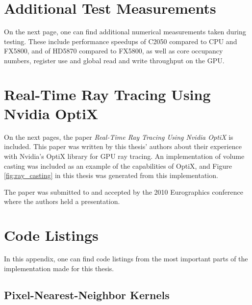 \documentclass[12pt, twoside, a4paper]{book}
\begin{document}
	
	
\chapter{Additional Test Measurements}
	\label{chapter:test_measurements}
	
	On the next page, one can find additional numerical measurements taken during testing. These include performance speedups of C2050 compared to CPU and FX5800, and of HD5870 compared to FX5800, as well as core occupancy numbers, register use and global read and write throughput on the GPU.
	
	
	
\chapter{Real-Time Ray Tracing Using Nvidia OptiX}
	\label{chapter:optix_paper}
	
	On the next pages, the paper \textit{Real-Time Ray Tracing Using Nvidia OptiX} \cite{ludvigsen2010} is included. This paper was written by this thesis' authors about their experience with Nvidia's OptiX library for GPU ray tracing. An implementation of volume casting was included as an example of the capabilities of OptiX, and Figure \ref{fig:ray_casting} in this thesis was generated from this implementation.
	
	The paper was submitted to and accepted by the 2010 Eurographics conference where the authors held a presentation.
	
	
	
\chapter{Code Listings}
	\label{chapter:code_listings}
	
	\lstset{numbers=left,language=C,breaklines=true,basicstyle=\footnotesize}
	
	In this appendix, one can find code listings from the most important parts of the implementation made for this thesis.
	
	\section{Pixel-Nearest-Neighbor Kernels}
		\label{section:pnn_kernel}
	
\end{document}
